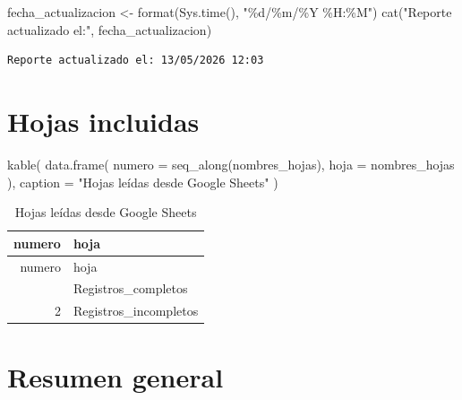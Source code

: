 \documentclass[
]{article}
\newenvironment{Shaded}{\begin{snugshade}}{\end{snugshade}}
\newcommand{\AttributeTok}[1]{\textcolor[rgb]{0.40,0.45,0.13}{#1}}
\newcommand{\FunctionTok}[1]{\textcolor[rgb]{0.28,0.35,0.67}{#1}}
\newcommand{\NormalTok}[1]{\textcolor[rgb]{0.00,0.23,0.31}{#1}}
\newcommand{\OtherTok}[1]{\textcolor[rgb]{0.00,0.23,0.31}{#1}}
\newcommand{\StringTok}[1]{\textcolor[rgb]{0.13,0.47,0.30}{#1}}
\begin{document}
\begin{Shaded}
\begin{Highlighting}[]
\NormalTok{fecha\_actualizacion }\OtherTok{\textless{}{-}} \FunctionTok{format}\NormalTok{(}\FunctionTok{Sys.time}\NormalTok{(), }\StringTok{"\%d/\%m/\%Y \%H:\%M"}\NormalTok{)}
\FunctionTok{cat}\NormalTok{(}\StringTok{"Reporte actualizado el:"}\NormalTok{, fecha\_actualizacion)}
\end{Highlighting}
\end{Shaded}

\begin{verbatim}
Reporte actualizado el: 13/05/2026 12:03
\end{verbatim}

\section{Hojas incluidas}\label{hojas-incluidas}

\begin{Shaded}
\begin{Highlighting}[]
\FunctionTok{kable}\NormalTok{(}
  \FunctionTok{data.frame}\NormalTok{(}
    \AttributeTok{numero =} \FunctionTok{seq\_along}\NormalTok{(nombres\_hojas),}
    \AttributeTok{hoja =}\NormalTok{ nombres\_hojas}
\NormalTok{  ),}
  \AttributeTok{caption =} \StringTok{"Hojas leídas desde Google Sheets"}
\NormalTok{)}
\end{Highlighting}
\end{Shaded}

\begin{longtable}[]{@{}rl@{}}
\caption{Hojas leídas desde Google Sheets}\tabularnewline
\toprule\noalign{}
numero & hoja \\
\midrule\noalign{}
\endfirsthead
\toprule\noalign{}
numero & hoja \\
\midrule\noalign{}
\endhead
\bottomrule\noalign{}
\endlastfoot
1 & Registros\_completos \\
2 & Registros\_incompletos \\
\end{longtable}

\section{Resumen general}\label{resumen-general}
\end{document}
